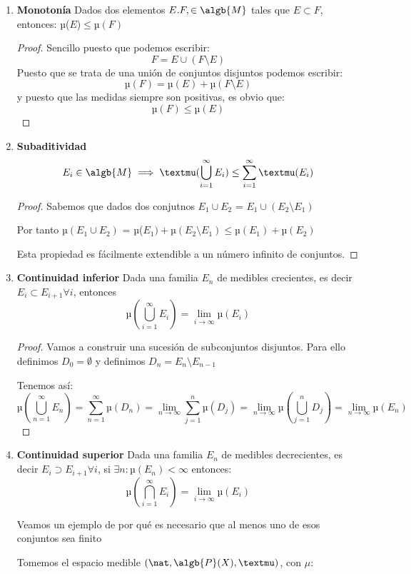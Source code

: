 \documentclass{apuntes}
\begin{document}
\begin{enumerate}
\item \textbf{Monotonía} Dados dos elementos $E. F, \in \algb{M}$ tales que $E\subset F$, entonces: µ($E$)$\leq µ(F)$
\begin{proof}
Sencillo puesto que podemos escribir:
\[F=E\cup(F \setminus E)\]
Puesto que se trata de una unión de conjuntos disjuntos podemos escribir:
\[µ(F)=µ(E)+µ(F\setminus E)\]
y puesto que las medidas siempre son positivas, es obvio que:
\[µ(F) \leq µ(E)\]
\end{proof}

\item \textbf{Subaditividad}
\[E_i \in \algb{M} \implies µ(\bigcup_{i=1}^{\infty}E_i)\leq \sum_{i=1}^{\infty}µ(E_i)\]

\begin{proof}
Sabemos que dados dos conjutnos $E_1 \cup E_2 $ = $E_1 \cup (E_2 \setminus E_1)$

Por tanto  $µ(E_1 \cup E_2) $ = µ($E_1) + µ(E_2 \setminus E_1) \leq µ(E_1)+µ(E_2)$

Esta propiedad es fácilmente extendible a un número infinito de conjuntos.
\end{proof}

\item \textbf{Continuidad inferior} Dada una familia $E_n$ de medibles crecientes, es decir $E_{i}\subset E_{i+1} \forall i$, entonces
\[µ(\bigcup_{i=1}^{\infty}E_i)=\lim_{i \to \infty} µ(E_i)\]

\begin{proof}
Vamos a construir una sucesión de subconjuntos disjuntos. Para ello definimos $D_0=\emptyset$ y definimos $D_n=E_n \setminus E_{n-1}$

Tenemos así:
\[µ(\bigcup_{n=1}^{\infty}E_n)=\sum_{n=1}^{\infty}µ(D_n)=\lim_{n \to \infty}
\sum_{j=1}^{n}µ(D_j)=\lim_{n \to \infty}µ(\bigcup_{j=1}^{n}D_j) = \lim_{n \to \infty}µ(E_n)\]
\end{proof}

\item \textbf{Continuidad superior} Dada una familia $E_n$ de medibles decrecientes, es decir $E_{i}\supset E_{i+1} \forall i$, si $\exists n: µ(E_n)< \infty$ entonces:
\[µ(\bigcap_{i=1}^{\infty}E_i)=\lim_{i \to \infty} µ(E_i)\]

Veamos un ejemplo de por qué es necesario que al menos uno de esos conjuntos sea finito
\begin{example}
Tomemos el espacio medible $(\nat, \algb{P}(X), µ)$, con $μ$:


\end{example}
\end{enumerate}
\end{document}
